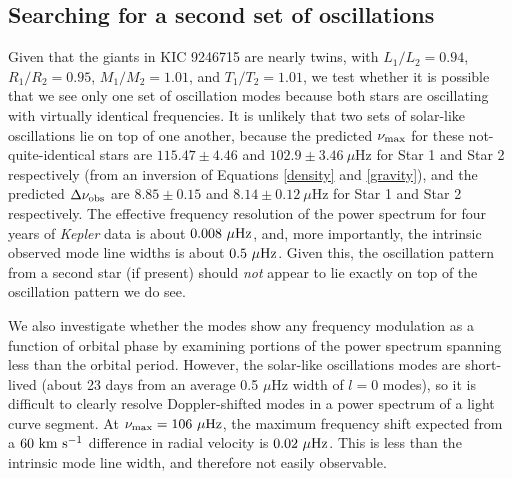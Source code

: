\subsection{Searching for a second set of oscillations}\label{search}

Given that the giants in KIC 9246715 are nearly twins, with $L_1/L_2 = 0.94$, $R_1/R_2 = 0.95$, $M_1/M_2 = 1.01$, and $T_1/T_2 = 1.01$, we test whether it is possible that we see only one set of oscillation modes because both stars are oscillating with virtually identical frequencies. It is unlikely that two sets of solar-like oscillations lie on top of one another, because the predicted $\nu_{\rm{max}}$ for these not-quite-identical stars are $115.47 \pm 4.46$ and $102.9 \pm 3.46\ \mu$Hz for Star 1 and Star 2 respectively (from an inversion of Equations \ref{density} and \ref{gravity}), and the predicted $\Delta\nu_{\rm{obs}}$ are $8.85 \pm 0.15$ and $8.14 \pm 0.12 \ \mu$Hz for Star 1 and Star 2 respectively. The effective frequency resolution of the power spectrum for four years of \emph{Kepler} data is about $0.008 \ \mu \rm{Hz}$, and, more importantly, the intrinsic observed mode line widths is about $0.5 \ \mu \rm{Hz}$. Given this, the oscillation pattern from a second star (if present) should \emph{not} appear to lie exactly on top of the oscillation pattern we do see. 

We also investigate whether the modes show any frequency modulation as a function of orbital phase by examining portions of the power spectrum spanning less than the orbital period. However, the solar-like oscillations modes are short-lived (about 23 days from an average 0.5 $\mu$Hz width of $l=0$ modes), so it is difficult to clearly resolve Doppler-shifted modes in a power spectrum of a light curve segment. At $\nu_{\rm{max}} = 106 \ \mu \rm{Hz}$, the maximum frequency shift expected from a $60 \ \rm{km} \ \rm{s}^{-1}$ difference in radial velocity is $0.02 \ \mu \rm{Hz}$. This is less than the intrinsic mode line width, and therefore not easily observable.

  
  
  